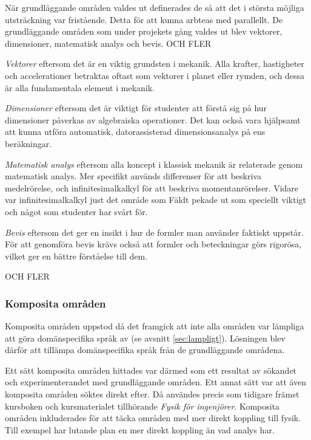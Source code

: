 \begin{binge}
När grundläggande områden valdes ut definerades de så att det i största möjliga utsträckning var fristående. Detta för att kunna arbteas med parallellt. De grundläggande områden som under projekets gång valdes ut blev vektorer, dimensioner, matematisk analys och bevis. OCH FLER

\textit{Vektorer} eftersom det är en viktig grundsten i mekanik. Alla krafter, hastigheter och accelerationer betraktas oftast som vektorer i planet eller rymden, och dessa är alla fundamentala element i mekanik.

\textit{Dimensioner} eftersom det är viktigt för studenter att förstå sig på hur dimensioner påverkas av algebraiska operationer. Det kan också vara hjälpsamt att kunna utföra automatisk, datorassisterad dimensionsanalys på ens beräkningar.

\textit{Matematisk analys} eftersom alla koncept i klassisk mekanik är relaterade genom matematisk analys. Mer specifikt används differenser för att beskriva medelrörelse, och infinitesimalkalkyl för att beskriva momentanrörelser. Vidare var infinitesimalkalkyl just det område som Fäldt pekade ut som speciellt viktigt och något som studenter har svårt för.

\textit{Bevis} eftersom det ger en insikt i hur de formler man använder faktiskt uppstår. För att genomföra bevis krävs också att formler och beteckningar görs rigorösa, vilket ger en bättre förståelse till dem.

OCH FLER
  
\subsubsection{Komposita områden}
\label{sec:selektion_komposit}

Komposita områden uppstod då det framgick att inte alla områden var lämpliga att göra domänspecifika språk av (se avsnitt \ref{sec:lampligt}). Lösningen blev därför att tillämpa domänspecifika språk från de grundläggande områdena.

Ett sätt komposita områden hittades var därmed som ett resultat av sökandet och experimenterandet med grundläggande områden. Ett annat sätt var att även komposita områden söktes direkt efter. Då användes precis som tidigare främst kursboken och kursmaterialet tillhörande \textit{Fysik för ingenjörer}. Komposita områden inkluderades för att täcka områden med mer direkt koppling till fysik. Till exempel har lutande plan en mer direkt koppling än vad analys har.


\end{binge}
